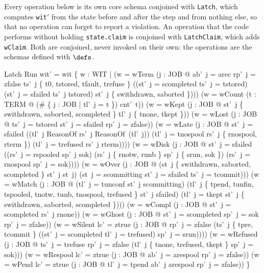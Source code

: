 \documentclass[a4paper,10pt,fleqn]{article}
\newcommand{\field}[1]{\texttt{#1}}
\begin{document}
Every operation below is its own core schema conjoined with \field{Latch}, which computes \field{wit}$'$ from the state before and after the step and from nothing else, so that no operation can forget to report a violation. An operation that the code performs without holding \field{state.claim} is conjoined with \field{LatchClaim}, which adds \field{wClaim}. Both are conjoined, never invoked on their own: the operations are the schemas defined with $\defs$.

\begin{schema}{Latch}
\Delta Run
\where
wit' = wit \cup \{ w : WIT |
  (w = wTerm \land (\exists j : JOB @ ab'~j = arec \land rp'~j = zfalse \land
     ts'~j \in \{ t0, tstored, tfault, trefuse \} \land
     \lnot ((st'~j = scompleted \land ts'~j = tstored) \lor
            (st'~j = sfailed \land ts'~j \neq tstored) \lor
            st'~j \in \{ swithdrawn, saborted \}))) \lor
  (w = wCount \land (\exists t : TERM @
     (\# \{ j : JOB | tl'~j = t \}) \neq cnt'~t)) \lor
  (w = wKept \land (\exists j : JOB @ st'~j \in \{ swithdrawn, saborted, scompleted \} \land
     tl'~j \notin \{ tnone, tkept \})) \lor
  (w = wLost \land (\exists j : JOB @ ts'~j = tstored \land st'~j = sfailed \land
     rp'~j = zfalse)) \lor
  (w = wLate \land (\exists j : JOB @ st'~j = sfailed \land
     ((tl'~j \in \dom ReasonOf \land rs'~j \neq ReasonOf~(tl'~j)) \lor
      (tl'~j = tnospool \land rs'~j \notin \{ rnospool, rterm \}) \lor
      (tl'~j = trefused \land rs'~j \neq rterm)))) \lor
  (w = wDisk \land (\exists j : JOB @ st'~j = sfailed \land
     ((rs'~j = rspooled \land sp'~j \neq sok) \lor
      (rs'~j \in \{ rnotw, runb \} \land sp'~j \in \{ srun, sok \}) \lor
      (rs'~j = rnospool \land sp'~j = sok)))) \lor
  (w = wOver \land (\exists j : JOB @
     (st~j \in \{ swithdrawn, saborted, scompleted \} \land st'~j \neq st~j) \lor
     (st~j = scommitting \land st'~j = sfailed \land ts'~j = tcommit))) \lor
  (w = wMatch \land (\exists j : JOB @
     (tl'~j = tunconf \land st'~j \neq scommitting) \lor
     (tl'~j \in \{ tpend, tunfin, tspooled, tnotw, tunb, tnospool, trefused \} \land
        st'~j \neq sfailed) \lor
     (tl'~j = tkept \land st'~j \notin \{ swithdrawn, saborted, scompleted \}))) \lor
  (w = wCompl \land (\exists j : JOB @ st'~j = scompleted \land rs'~j \neq rnone)) \lor
  (w = wGhost \land (\exists j : JOB @ st'~j = scompleted \land sp'~j = sok \land
     rp'~j = zfalse)) \lor
  (w = wSilent \land lc' = ztrue \land (\exists j : JOB @ rp'~j = zfalse \land
     (ts'~j \in \{ tpre, tcommit \} \lor
      ((st'~j = scompleted \lor tl'~j = trefused) \land sp'~j = srun)))) \lor
  (w = wRefused \land (\exists j : JOB @ ts'~j = trefuse \land rp'~j = zfalse \land
     (tl'~j \notin \{ tnone, trefused, tkept \} \lor sp'~j = sok))) \lor
  (w = wRespool \land lc' = ztrue \land
     (\exists j : JOB @ ab'~j = arespool \land rp'~j = zfalse)) \lor
  (w = wPend \land lc' = ztrue \land
     (\exists j : JOB @ tl'~j = tpend \land ab'~j \neq arespool \land rp'~j = zfalse)) \}
\end{schema}
\end{document}
